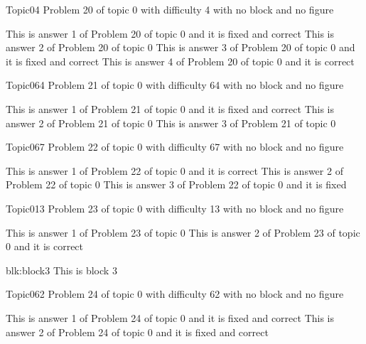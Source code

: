 \documentclass[master]{exam}
\begin{document}
\begin{problem}{Topic0}{4}
	Problem 20 of topic 0 with difficulty 4 with no block and no figure
	\begin{answers}
		 This is answer 1 of Problem 20 of topic 0 and it is fixed and correct
		\answer This is answer 2 of Problem 20 of topic 0 
		 This is answer 3 of Problem 20 of topic 0 and it is fixed and correct
		\answer[correct] This is answer 4 of Problem 20 of topic 0 and it is correct
	\end{answers}
\end{problem}

\begin{problem}{Topic0}{64}
	Problem 21 of topic 0 with difficulty 64 with no block and no figure
	\begin{answers}
		 This is answer 1 of Problem 21 of topic 0 and it is fixed and correct
		\answer This is answer 2 of Problem 21 of topic 0 
		\answer This is answer 3 of Problem 21 of topic 0 
	\end{answers}
\end{problem}

\begin{problem}{Topic0}{67}
	Problem 22 of topic 0 with difficulty 67 with no block and no figure
	\begin{answers}
		\answer[correct] This is answer 1 of Problem 22 of topic 0 and it is correct
		\answer This is answer 2 of Problem 22 of topic 0 
		\answer[fixed] This is answer 3 of Problem 22 of topic 0 and it is fixed
	\end{answers}
\end{problem}

\begin{problem}{Topic0}{13}
	Problem 23 of topic 0 with difficulty 13 with no block and no figure
	\begin{answers}
		\answer This is answer 1 of Problem 23 of topic 0 
		\answer[correct] This is answer 2 of Problem 23 of topic 0 and it is correct
	\end{answers}
\end{problem}



\begin{block}{blk:block3}
This is block 3
\end{block}


\begin{problem}{Topic0}{62}
	Problem 24 of topic 0 with difficulty 62 with no block and no figure
	\begin{answers}
		 This is answer 1 of Problem 24 of topic 0 and it is fixed and correct
		 This is answer 2 of Problem 24 of topic 0 and it is fixed and correct
	\end{answers}
\end{problem}
\end{document}

